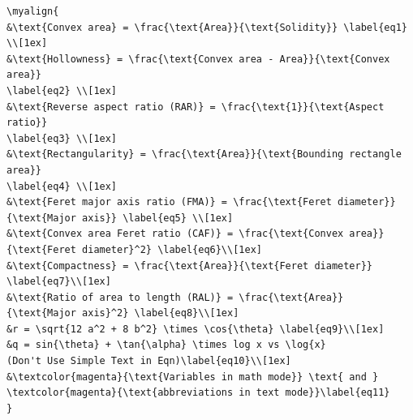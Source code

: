 \documentclass[phd,showgrids]{ndsu-thesis-2022}
\begin{document}
\vspace{1ex}
{\singlespacing
\begin{verbatim}
\myalign{
&\text{Convex area} = \frac{\text{Area}}{\text{Solidity}} \label{eq1} \\[1ex]
&\text{Hollowness} = \frac{\text{Convex area - Area}}{\text{Convex area}} 
\label{eq2} \\[1ex]
&\text{Reverse aspect ratio (RAR)} = \frac{\text{1}}{\text{Aspect ratio}} 
\label{eq3} \\[1ex]
&\text{Rectangularity} = \frac{\text{Area}}{\text{Bounding rectangle area}} 
\label{eq4} \\[1ex]
&\text{Feret major axis ratio (FMA)} = \frac{\text{Feret diameter}}
{\text{Major axis}} \label{eq5} \\[1ex]
&\text{Convex area Feret ratio (CAF)} = \frac{\text{Convex area}}
{\text{Feret diameter}^2} \label{eq6}\\[1ex]
&\text{Compactness} = \frac{\text{Area}}{\text{Feret diameter}} 
\label{eq7}\\[1ex]
&\text{Ratio of area to length (RAL)} = \frac{\text{Area}}
{\text{Major axis}^2} \label{eq8}\\[1ex]
&r = \sqrt{12 a^2 + 8 b^2} \times \cos{\theta} \label{eq9}\\[1ex]
&q = sin{\theta} + \tan{\alpha} \times log x vs \log{x} 
(Don't Use Simple Text in Eqn)\label{eq10}\\[1ex]
&\textcolor{magenta}{\text{Variables in math mode}} \text{ and }  
\textcolor{magenta}{\text{abbreviations in text mode}}\label{eq11}
}
\end{verbatim}
}

\end{document}
